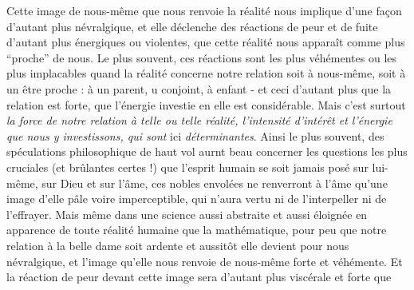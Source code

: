 Cette image de nous-même que nous renvoie la réalité nous implique d'une façon d'autant plus névralgique, et elle déclenche des réactions de peur et de fuite d'autant plus énergiques ou violentes, que cette réalité nous apparaît comme plus ``proche'' de nous. Le plus souvent, ces réactions sont les plus véhémentes ou les plus implacables quand la réalité concerne notre relation soit à nous-même, soit à un être proche : à un parent, \margin{\handwritten{$\bullet$}}u conjoint, à \margin{\handwritten{$\bullet$}} enfant - et ceci d'autant plus que la relation est forte, que l'énergie investie en elle est considérable. Mais c'est surtout \textit{la force de notre relation à telle ou telle réalité, l'intensité d'intérêt et l'énergie que nous y investissons, qui sont} ici \textit{déterminantes}. Ainsi le plus souvent, des spéculations philosophique de haut vol\margin{\handwritten{$\bullet\ \bullet$}}\deleted{\unsure{,}}\handwritten{/} aurnt beau concerner les questions les plus cruciales (et brûlantes certes !) que l'esprit humain se soit jamais posé sur lui-même, sur Dieu et sur l'âme, ces nobles envolées ne renverront à l'âme qu'une image d'elle pâle voire imperceptible, qui n'aura vertu ni de l'interpeller ni de l'effrayer. Mais même dans une science aussi abstraite et aussi éloignée en apparence de toute réalité humaine que la mathématique, pour peu que notre relation à la belle dame soit ardente et aussitôt elle devient pour nous névralgique, et l'image qu'elle nous renvoie de nous-même forte et véhémente. Et la réaction de peur devant cette image sera d'autant plus viscérale et forte que
